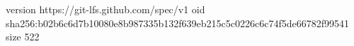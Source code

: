 version https://git-lfs.github.com/spec/v1
oid sha256:b02b6c6d7b10080e8b987335b132f639eb215c5c0226c6c74f5de66782f99541
size 522
